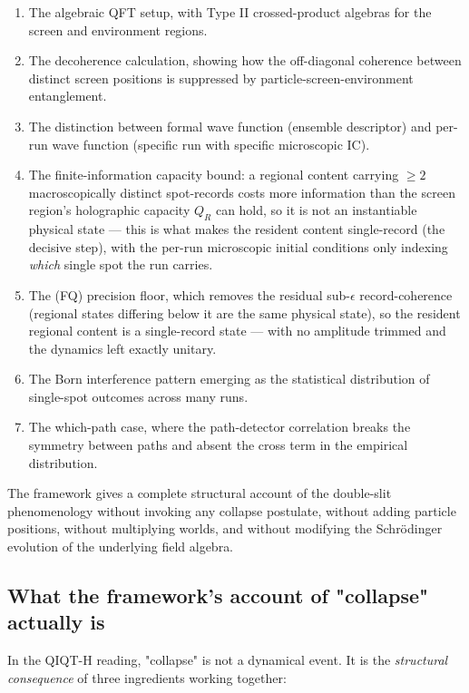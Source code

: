 \documentclass[11pt,a4paper]{article}
\begin{document}
\begin{enumerate}
  \item The algebraic QFT setup, with Type II crossed-product algebras for the screen and environment regions.
  \item The decoherence calculation, showing how the off-diagonal coherence between distinct screen positions is suppressed by particle-screen-environment entanglement.
  \item The distinction between formal wave function (ensemble descriptor) and per-run wave function (specific run with specific microscopic IC).
  \item The finite-information capacity bound: a regional content carrying $\ge 2$ macroscopically distinct spot-records costs more information than the screen region's holographic capacity $Q_R$ can hold, so it is not an instantiable physical state — this is what makes the resident content single-record (the decisive step), with the per-run microscopic initial conditions only indexing \emph{which} single spot the run carries.
  \item The (FQ) precision floor, which removes the residual sub-$\epsilon$ record-coherence (regional states differing below it are the same physical state), so the resident regional content is a single-record state — with no amplitude trimmed and the dynamics left exactly unitary.
  \item The Born interference pattern emerging as the statistical distribution of single-spot outcomes across many runs.
  \item The which-path case, where the path-detector correlation breaks the symmetry between paths and absent the cross term in the empirical distribution.
\end{enumerate}

The framework gives a complete structural account of the double-slit phenomenology without invoking any collapse postulate, without adding particle positions, without multiplying worlds, and without modifying the Schrödinger evolution of the underlying field algebra.

\subsection{What the framework's account of "collapse" actually is}

In the QIQT-H reading, "collapse" is not a dynamical event. It is the \emph{structural consequence} of three ingredients working together:
\end{document}

